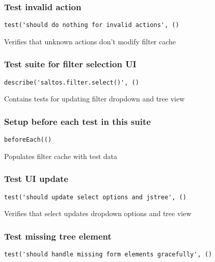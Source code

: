 \documentclass[a4paper]{article}
\begin{document}
\subsubsection{Test invalid action}

\begin{lstlisting}
test('should do nothing for invalid actions', ()
\end{lstlisting}

Verifies that unknown actions don't modify filter cache

\hypertarget{toc172}{}
\subsubsection{Test suite for filter selection UI}

\begin{lstlisting}
describe('saltos.filter.select()', ()
\end{lstlisting}

Contains tests for updating filter dropdown and tree view

\hypertarget{toc173}{}
\subsubsection{Setup before each test in this suite}

\begin{lstlisting}
beforeEach(()
\end{lstlisting}

Populates filter cache with test data

\hypertarget{toc174}{}
\subsubsection{Test UI update}

\begin{lstlisting}
test('should update select options and jstree', ()
\end{lstlisting}

Verifies that select updates dropdown options and tree view

\hypertarget{toc175}{}
\subsubsection{Test missing tree element}

\begin{lstlisting}
test('should handle missing form elements gracefully', ()
\end{lstlisting}
\end{document}
